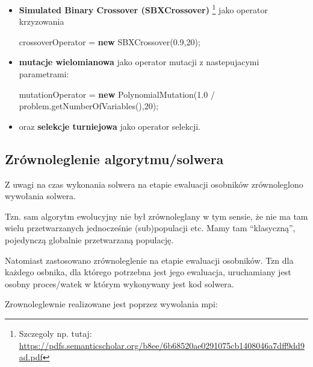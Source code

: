 \documentclass[]{article}
\newenvironment{Shaded}{}{}
\newcommand{\KeywordTok}[1]{\textcolor[rgb]{0.00,0.44,0.13}{\textbf{{#1}}}}
\newcommand{\DecValTok}[1]{\textcolor[rgb]{0.25,0.63,0.44}{{#1}}}
\newcommand{\FloatTok}[1]{\textcolor[rgb]{0.25,0.63,0.44}{{#1}}}
\newcommand{\FunctionTok}[1]{\textcolor[rgb]{0.02,0.16,0.49}{{#1}}}
\newcommand{\NormalTok}[1]{{#1}}
\begin{document}
\begin{itemize}
\item
  \textbf{Simulated Binary Crossover (SBXCrossover)}
  \footnote{Szczegoly np. tutaj: \url{https://pdfs.semanticscholar.org/b8ee/6b68520ae0291075cb1408046a7dff9dd9ad.pdf}}
  jako operator krzyzowania

\begin{Shaded}
\begin{Highlighting}[]
\NormalTok{crossoverOperator = }\KeywordTok{new} \FunctionTok{SBXCrossover}\NormalTok{(}\FloatTok{0.9}\NormalTok{,}\DecValTok{20}\NormalTok{);  }
\end{Highlighting}
\end{Shaded}
\item
  \textbf{mutacje wielomianowa} jako operator mutacji z nastepujacymi
  parametrami:

\begin{Shaded}
\begin{Highlighting}[]
\NormalTok{mutationOperator = }\KeywordTok{new} \FunctionTok{PolynomialMutation}\NormalTok{(}\FloatTok{1.0} \NormalTok{/ problem.}\FunctionTok{getNumberOfVariables}\NormalTok{(),}\DecValTok{20}\NormalTok{);}
\end{Highlighting}
\end{Shaded}
\item
  oraz \textbf{selekcje turniejowa} jako operator selekcji.
\end{itemize}

\subsection{Zrównoleglenie
algorytmu/solwera}\label{zruxf3wnoleglenie-algorytmusolwera}

Z uwagi na czas wykonania solwera na etapie ewaluacji osobników
zrównoleglono wywołania solwera.

Tzn. sam algorytm ewolucyjny nie był zrównoleglany w tym sensie, że nie
ma tam wielu przetwarzanych jednocześnie (sub)populacji etc. Mamy tam
``klasyczną'', pojedynczą globalnie przetwarzaną populację.

Natomiast zastosowano zrównoleglenie na etapie ewaluacji osobników. Tzn
dla każdego osbnika, dla którego potrzebna jest jego ewaluacja,
uruchamiany jest osobny proces/watek w którym wykonywany jest kod
solwera.

Zrownoleglewnie realizowane jest poprzez wywolania mpi:
\end{document}

